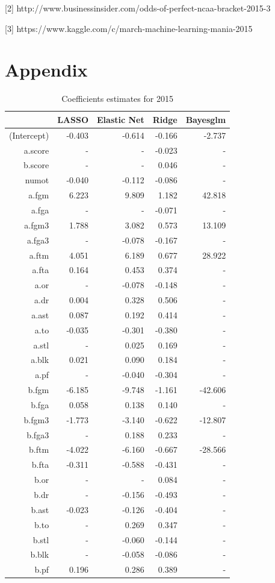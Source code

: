 \documentclass{article} %
\begin{document}
[2] http://www.businessinsider.com/odds-of-perfect-ncaa-bracket-2015-3

[3] https://www.kaggle.com/c/march-machine-learning-mania-2015





\newpage
\section{Appendix}
\begin{table}[H]
\centering
{\small
\begin{tabular}{rrrrr}
  \hline
 & LASSO & Elastic Net & Ridge & Bayesglm \\ 
  \hline
(Intercept) & -0.403 & -0.614 & -0.166 & -2.737 \\ 
  a.score & - & - & -0.023 & - \\ 
  b.score & - & - & 0.046 & - \\ 
  numot & -0.040 & -0.112 & -0.086 & - \\ 
  a.fgm & 6.223 & 9.809 & 1.182 & 42.818 \\ 
  a.fga & - & - & -0.071 & - \\ 
  a.fgm3 & 1.788 & 3.082 & 0.573 & 13.109 \\ 
  a.fga3 & - & -0.078 & -0.167 & - \\ 
  a.ftm & 4.051 & 6.189 & 0.677 & 28.922 \\ 
  a.fta & 0.164 & 0.453 & 0.374 & - \\ 
  a.or & - & -0.078 & -0.148 & - \\ 
  a.dr & 0.004 & 0.328 & 0.506 & - \\ 
  a.ast & 0.087 & 0.192 & 0.414 & - \\ 
  a.to & -0.035 & -0.301 & -0.380 & - \\ 
  a.stl & - & 0.025 & 0.169 & - \\ 
  a.blk & 0.021 & 0.090 & 0.184 & - \\ 
  a.pf & - & -0.040 & -0.304 & - \\ 
  b.fgm & -6.185 & -9.748 & -1.161 & -42.606 \\ 
  b.fga & 0.058 & 0.138 & 0.140 & - \\ 
  b.fgm3 & -1.773 & -3.140 & -0.622 & -12.807 \\ 
  b.fga3 & - & 0.188 & 0.233 & - \\ 
  b.ftm & -4.022 & -6.160 & -0.667 & -28.566 \\ 
  b.fta & -0.311 & -0.588 & -0.431 & - \\ 
  b.or & - & - & 0.084 & - \\ 
  b.dr & - & -0.156 & -0.493 & - \\ 
  b.ast & -0.023 & -0.126 & -0.404 & - \\ 
  b.to & - & 0.269 & 0.347 & - \\ 
  b.stl & - & -0.060 & -0.144 & - \\ 
  b.blk & - & -0.058 & -0.086 & - \\ 
  b.pf & 0.196 & 0.286 & 0.389 & - \\ 
   \hline
\end{tabular}
}
\caption{Coefficients estimates for 2015}\
\end{table}
\end{document}
